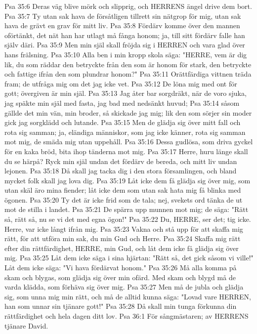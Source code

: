 Psa 35:6  Deras väg blive mörk och slipprig, och HERRENS ängel drive dem bort.
Psa 35:7  Ty utan sak hava de försåtligen tillrett sin nätgrop för mig, utan sak hava de grävt en grav för mitt liv.
Psa 35:8  Fördärv komme över den mannen oförtänkt, det nät han har utlagt må fånga honom; ja, till sitt fördärv falle han själv däri.
Psa 35:9  Men min själ skall fröjda sig i HERREN och vara glad över hans frälsning.
Psa 35:10  Alla ben i min kropp skola säga: "HERRE, vem är dig lik, du som räddar den betryckte från den som är honom för stark, den betryckte och fattige ifrån den som plundrar honom?"
Psa 35:11  Orättfärdiga vittnen träda fram; de utfråga mig om det jag icke vet.
Psa 35:12  De löna mig med ont för gott; övergiven är min själ.
Psa 35:13  Jag åter bar sorgdräkt, när de voro sjuka, jag späkte min själ med fasta, jag bad med nedsänkt huvud;
Psa 35:14  såsom gällde det min vän, min broder, så skickade jag mig; lik den som sörjer sin moder gick jag sorgklädd och lutande.
Psa 35:15  Men de glädja sig över mitt fall och rota sig samman; ja, eländiga människor, som jag icke känner, rota sig samman mot mig, de smäda mig utan uppehåll.
Psa 35:16  Dessa gudlösa, som driva gyckel för en kaka bröd, bita ihop tänderna mot mig.
Psa 35:17  Herre, huru länge skall du se härpå? Ryck min själ undan det fördärv de bereda, och mitt liv undan lejonen.
Psa 35:18  Då skall jag tacka dig i den stora församlingen, och bland mycket folk skall jag lova dig.
Psa 35:19  Låt icke dem få glädja sig över mig, som utan skäl äro mina fiender; låt icke dem som utan sak hata mig få blinka med ögonen.
Psa 35:20  Ty det är icke frid som de tala; nej, svekets ord tänka de ut mot de stilla i landet.
Psa 35:21  De spärra upp munnen mot mig; de säga: "Rätt så, rätt så, nu se vi det med egna ögon!"
Psa 35:22  Du, HERRE, ser det; tig icke. Herre, var icke långt ifrån mig.
Psa 35:23  Vakna och stå upp för att skaffa mig rätt, för att utföra min sak, du min Gud och Herre.
Psa 35:24  Skaffa mig rätt efter din rättfärdighet, HERRE, min Gud, och låt dem icke få glädja sig över mig.
Psa 35:25  Låt dem icke säga i sina hjärtan: "Rätt så, det gick såsom vi ville!" Låt dem icke säga: "Vi hava fördärvat honom."
Psa 35:26  Må alla komma på skam och blygas, som glädja sig över min ofärd. Med skam och blygd må de varda klädda, som förhäva sig över mig.
Psa 35:27  Men må de jubla och glädja sig, som unna mig min rätt, och må de alltid kunna säga: "Lovad vare HERREN, han som unnar sin tjänare gott!"
Psa 35:28  Då skall min tunga förkunna din rättfärdighet och hela dagen ditt lov.
Psa 36:1  För sångmästaren; av HERRENS tjänare David.
